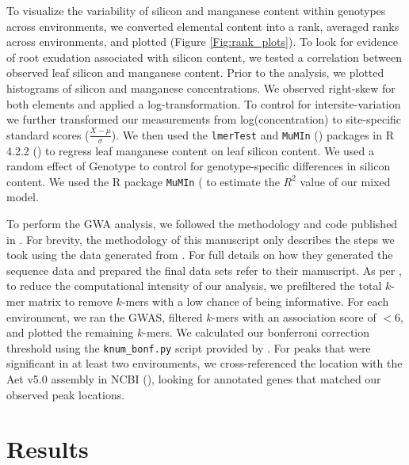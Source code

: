 \documentclass[12pt, letterpaper, ]{report}
\begin{document}
To visualize the variability of silicon and manganese content within genotypes across environments, we converted elemental content into a rank, averaged ranks across environments, and plotted (Figure \ref{Fig:rank_plots}). 
To look for evidence of root exudation associated with silicon content, we tested a correlation between observed leaf silicon and manganese content. Prior to the analysis, we plotted histograms of silicon and manganese concentrations. We observed right-skew for both elements and applied a log-transformation. To control for intersite-variation we further transformed our measurements from log(concentration) to site-specific standard scores ($\frac{X - \mu}{\sigma}$). We then used the \verb|lmerTest| and \verb|MuMIn| (\cite{kuznetsova_2017_lmerTest,barton_2023_mumin}) packages in R 4.2.2 (\cite{r_core_team_2022}) to regress leaf manganese content on leaf silicon content. We used a random effect of Genotype to control for genotype-specific differences in silicon content. We used the R package \verb|MuMIn| (\cite{barton_2023_mumin} to estimate the $R^2$ value of our mixed model.

To perform the GWA analysis, we followed the methodology and code published in \textcite{gaurav_population_2022}. For brevity, the methodology of this manuscript only describes the steps we took using the data generated from \textcite{gaurav_population_2022}. For full details on how they generated the sequence data and prepared the final data sets refer to their manuscript. As per \textcite{gaurav_population_2022}, to reduce the computational intensity of our analysis, we prefiltered the total $k$-mer matrix to remove $k$-mers with a low chance of being informative. For each environment, we ran the GWAS, filtered $k$-mers with an association score of $<6$, and plotted the remaining $k$-mers. We calculated our bonferroni correction threshold using the \verb|knum_bonf.py| script provided by \textcite{gaurav_population_2022}. For peaks that were significant in at least two environments, we cross-referenced the location with the Aet v5.0 assembly in NCBI (\cite{wang_aegilops_2021}), looking for annotated genes that matched our observed peak locations. 

\section{Results}
\end{document}
